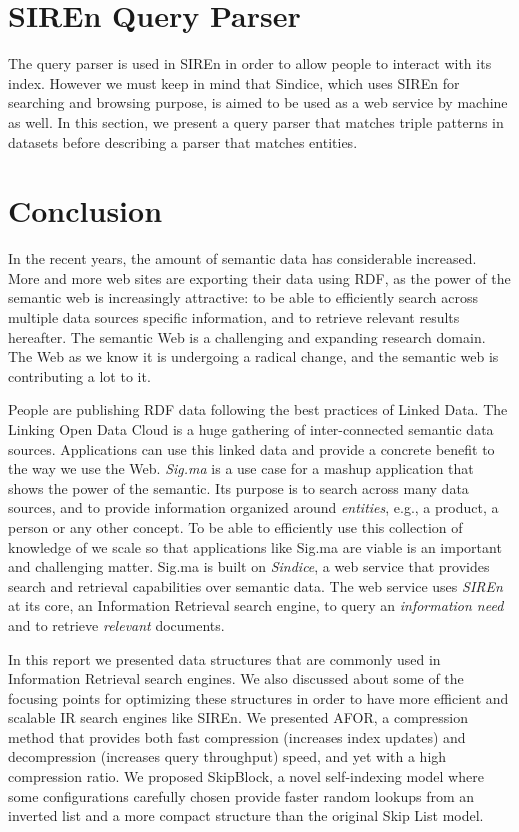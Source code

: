 \chapter{SIREn Query Parser}{
The query parser is used in SIREn in order to allow people to interact with its
index. However we must keep in mind that Sindice, which uses SIREn for
searching and browsing purpose, is aimed to be used as a web service by machine
as well. In this section, we present a query parser that matches triple
patterns in datasets before describing a parser that matches entities.
}
\label{chap:siren-extension}


\chapter{Conclusion}{
In the recent years, the amount of semantic data has considerable increased.
More and more web sites are exporting their data using RDF, as the power of the
semantic web is increasingly attractive: to be able to efficiently search
across multiple data sources specific information, and to retrieve relevant
results hereafter. The semantic Web is a challenging and expanding research
domain. The Web as we know it is undergoing a radical change, and the semantic
web is contributing a lot to it.

People are publishing RDF data following the best practices of Linked Data. The
Linking Open Data Cloud is a huge gathering of inter-connected semantic data
sources. Applications can use this linked data and provide a concrete benefit
to the way we use the Web. \emph{Sig.ma} is a use case for a mashup application
that shows the power of the semantic. Its purpose is to search across many
data sources, and to provide information organized around \emph{entities},
e.g., a product, a person or any other concept. To be able to efficiently use
this collection of knowledge of we scale so that applications like Sig.ma are
viable is an important and challenging matter. Sig.ma is built on
\emph{Sindice}, a web service that provides search and retrieval capabilities
over semantic data. The web service uses \emph{SIREn} at its core, an
Information Retrieval search engine, to query an \emph{information need} and
to retrieve \emph{relevant} documents.

In this report we presented data structures that are commonly used in
Information Retrieval search engines. We also discussed about some of the
focusing points for optimizing these structures in order to have more efficient
and scalable IR search engines like SIREn.
We presented AFOR, a compression method that provides both fast compression
(increases index updates) and decompression (increases query throughput) speed,
and yet with a high compression ratio. We proposed SkipBlock, a novel
self-indexing model where some configurations carefully chosen provide faster
random lookups from an inverted list and a more compact structure than the
original Skip List model.}
\label{chap:conclusion}

